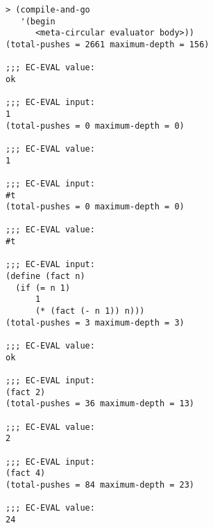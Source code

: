 \documentclass[a4paper,12pt]{article}
\begin{document}
\begin{lstlisting}
> (compile-and-go
   '(begin
      <meta-circular evaluator body>))
(total-pushes = 2661 maximum-depth = 156)

;;; EC-EVAL value:
ok

;;; EC-EVAL input:
1
(total-pushes = 0 maximum-depth = 0)

;;; EC-EVAL value:
1

;;; EC-EVAL input:
#t
(total-pushes = 0 maximum-depth = 0)

;;; EC-EVAL value:
#t

;;; EC-EVAL input:
(define (fact n)
  (if (= n 1)
      1
      (* (fact (- n 1)) n)))
(total-pushes = 3 maximum-depth = 3)

;;; EC-EVAL value:
ok

;;; EC-EVAL input:
(fact 2)
(total-pushes = 36 maximum-depth = 13)

;;; EC-EVAL value:
2

;;; EC-EVAL input:
(fact 4)
(total-pushes = 84 maximum-depth = 23)

;;; EC-EVAL value:
24
\end{lstlisting}
\end{document}
